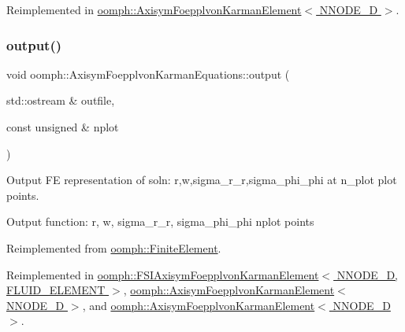 Reimplemented in \hyperlink{classoomph_1_1AxisymFoepplvonKarmanElement_a09a7d0ec1c8c495c7703e6c034d8eafc}{oomph\+::\+Axisym\+Foepplvon\+Karman\+Element$<$ N\+N\+O\+D\+E\+\_\+D $>$}.

\mbox{\label{classoomph_1_1AxisymFoepplvonKarmanEquations_a704051a00a2c8624edb98f3ba05e63a2}} 
\subsubsection{\texorpdfstring{output()}{output()}\hspace{0.1cm}{\footnotesize\ttfamily [6/8]}}
{\footnotesize\ttfamily void oomph\+::\+Axisym\+Foepplvon\+Karman\+Equations\+::output (\begin{DoxyParamCaption}\item[{std\+::ostream \&}]{outfile,  }\item[{const unsigned \&}]{nplot }\end{DoxyParamCaption})\hspace{0.3cm}{\ttfamily [virtual]}}



Output FE representation of soln\+: r,w,sigma\+\_\+r\+\_\+r,sigma\+\_\+phi\+\_\+phi at n\+\_\+plot plot points. 

Output function\+: r, w, sigma\+\_\+r\+\_\+r, sigma\+\_\+phi\+\_\+phi nplot points 

Reimplemented from \hyperlink{classoomph_1_1FiniteElement_afa9d9b2670f999b43e6679c9dd28c457}{oomph\+::\+Finite\+Element}.



Reimplemented in \hyperlink{classoomph_1_1FSIAxisymFoepplvonKarmanElement_a03c82e935db8c1c93dfe2f443ec5e817}{oomph\+::\+F\+S\+I\+Axisym\+Foepplvon\+Karman\+Element$<$ N\+N\+O\+D\+E\+\_\+D, F\+L\+U\+I\+D\+\_\+\+E\+L\+E\+M\+E\+N\+T $>$}, \hyperlink{classoomph_1_1AxisymFoepplvonKarmanElement_a435aab946dfcaa0b23e7df59e9bc3933}{oomph\+::\+Axisym\+Foepplvon\+Karman\+Element$<$ N\+N\+O\+D\+E\+\_\+D $>$}, and \hyperlink{classoomph_1_1AxisymFoepplvonKarmanElement_a435aab946dfcaa0b23e7df59e9bc3933}{oomph\+::\+Axisym\+Foepplvon\+Karman\+Element$<$ N\+N\+O\+D\+E\+\_\+D $>$}.



